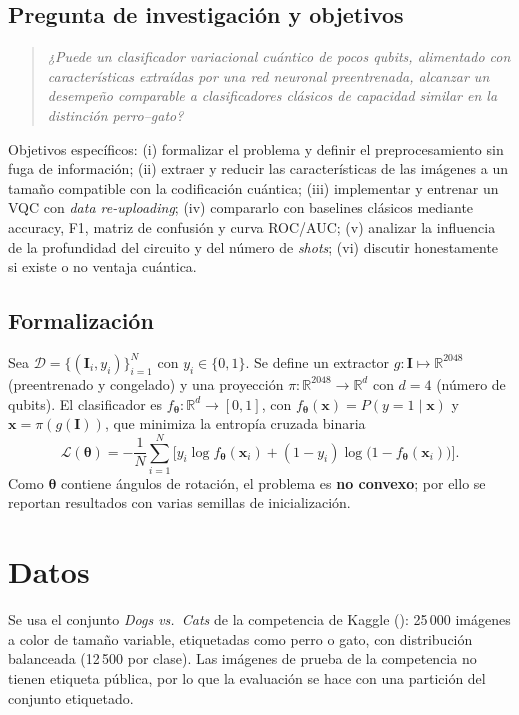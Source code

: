 \documentclass[11pt,letterpaper]{article}
\newcommand{\R}{\mathbb{R}}
\begin{document}
\subsection{Pregunta de investigación y objetivos}
\begin{quote}
\emph{¿Puede un clasificador variacional cuántico de pocos qubits, alimentado con
características extraídas por una red neuronal preentrenada, alcanzar un desempeño comparable a
clasificadores clásicos de capacidad similar en la distinción perro--gato?}
\end{quote}
Objetivos específicos: (i) formalizar el problema y definir el preprocesamiento sin fuga de
información; (ii) extraer y reducir las características de las imágenes a un tamaño compatible con
la codificación cuántica; (iii) implementar y entrenar un VQC con \emph{data re-uploading};
(iv) compararlo con baselines clásicos mediante accuracy, F1, matriz de confusión y curva ROC/AUC;
(v) analizar la influencia de la profundidad del circuito y del número de \emph{shots}; (vi)
discutir honestamente si existe o no ventaja cuántica.

\subsection{Formalización}
Sea $\mathcal{D}=\{(\bm{I}_i,y_i)\}_{i=1}^{N}$ con $y_i\in\{0,1\}$. Se define un extractor
$g:\bm{I}\mapsto\R^{2048}$ (preentrenado y congelado) y una proyección $\pi:\R^{2048}\to\R^{d}$ con
$d=4$ (número de qubits). El clasificador es
$f_{\bm\theta}:\R^{d}\to[0,1]$, con $f_{\bm\theta}(\bm{x})=P(y=1\mid\bm{x})$ y $\bm{x}=\pi(g(\bm{I}))$,
que minimiza la entropía cruzada binaria
\begin{equation}
\mathcal{L}(\bm\theta)=-\frac{1}{N}\sum_{i=1}^{N}\Big[y_i\log f_{\bm\theta}(\bm{x}_i)+(1-y_i)\log\big(1-f_{\bm\theta}(\bm{x}_i)\big)\Big].
\label{eq:loss}
\end{equation}
Como $\bm\theta$ contiene ángulos de rotación, el problema es \textbf{no convexo}; por ello se
reportan resultados con varias semillas de inicialización.

\section{Datos}
Se usa el conjunto \emph{Dogs vs.\ Cats} de la competencia de Kaggle (\cite{kaggle2013}): 25\,000
imágenes a color de tamaño variable, etiquetadas como perro o gato, con distribución balanceada
(12\,500 por clase). Las imágenes de prueba de la competencia no tienen etiqueta pública, por lo
que la evaluación se hace con una partición del conjunto etiquetado.
\end{document}
